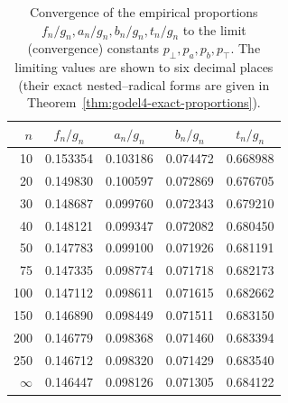\documentclass[11pt]{article}
\newcommand{\ptop}{p_{\top}}
\newcommand{\pbot}{p_{\bot}}
\begin{document}
\newpage
\begin{table}[t]
\centering
\small
\renewcommand{\arraystretch}{1.05}
\begin{tabular}{rcccc}
\hline
\(n\) & \(f_n/g_n\) & \(a_n/g_n\) & \(b_n/g_n\) & \(t_n/g_n\) \\
\hline
10  & 0.153354 & 0.103186 & 0.074472 & 0.668988 \\
20  & 0.149830 & 0.100597 & 0.072869 & 0.676705 \\
30  & 0.148687 & 0.099760 & 0.072343 & 0.679210 \\
40  & 0.148121 & 0.099347 & 0.072082 & 0.680450 \\
50  & 0.147783 & 0.099100 & 0.071926 & 0.681191 \\
75  & 0.147335 & 0.098774 & 0.071718 & 0.682173 \\
100 & 0.147112 & 0.098611 & 0.071615 & 0.682662 \\
150 & 0.146890 & 0.098449 & 0.071511 & 0.683150 \\
200 & 0.146779 & 0.098368 & 0.071460 & 0.683394 \\
250 & 0.146712 & 0.098320 & 0.071429 & 0.683540 \\
\hline
\(\infty\) & 0.146447 & 0.098126 & 0.071305 & 0.684122 \\
\hline
\end{tabular}
\caption{Convergence of the empirical proportions \(f_n/g_n,a_n/g_n,b_n/g_n,t_n/g_n\) to the
limit (convergence) constants \(\pbot ,p_a,p_b,\ptop \). The limiting values are shown to six
decimal places (their exact nested--radical forms are given in
Theorem~\ref{thm:godel4-exact-proportions}).}
\label{tab:g4-proportions}
\end{table}
\end{document}
